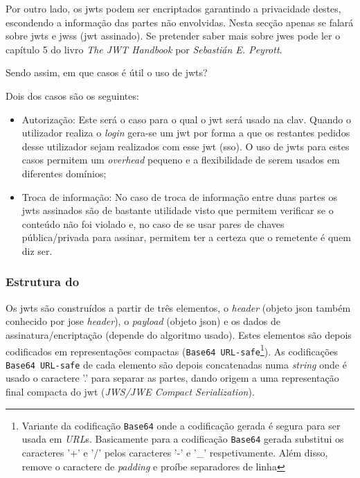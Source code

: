 Por outro lado, os \acrshort{jwt}s podem ser encriptados garantindo a privacidade destes, escondendo a informação 
das partes não envolvidas. Nesta secção apenas se falará sobre \acrshort{jwt}s e \acrshort{jws}s (\acrshort{jwt} 
assinado). Se pretender saber mais sobre \acrshort{jwe}s pode ler o capítulo 5 do livro \textit{The JWT Handbook} 
por \textit{Sebastián E. Peyrott}.

Sendo assim, em que casos é útil o uso de \acrshort{jwt}s? 

Dois dos casos são os seguintes:
\begin{itemize}
    \item Autorização: Este será o caso para o qual o \acrshort{jwt} será usado na \acrshort{clav}. 
    Quando o utilizador realiza o \textit{login} gera-se um \acrshort{jwt} por forma a que os restantes pedidos 
    desse utilizador sejam realizados com esse \acrshort{jwt} (\acrlong{sso}). 
    O uso de \acrshort{jwt}s para estes casos permitem um \textit{overhead} pequeno e a flexibilidade de serem 
    usados em diferentes domínios;
    \item Troca de informação: No caso de troca de informação entre duas partes os \acrshort{jwt}s assinados são 
    de bastante utilidade visto que permitem verificar se o conteúdo não foi violado e, no caso de se usar pares 
    de chaves pública/privada para assinar, permitem ter a certeza que o remetente é quem diz ser.
\end{itemize}

\subsubsection{Estrutura do }

Os \acrshort{jwt}s são construídos a partir de três elementos, o \textit{header} (objeto \acrshort{json} também 
conhecido por \acrshort{jose} \textit{header}), o \textit{payload} (objeto \acrshort{json}) e os dados de 
assinatura/encriptação (depende do algoritmo usado). Estes elementos são depois codificados em representações 
compactas (\texttt{Base64 URL-safe}\footnote{Variante da codificação \texttt{Base64} onde a codificação gerada 
é segura para ser usada em \textit{URL}s. Basicamente para a codificação \texttt{Base64} gerada substitui os 
caracteres '+' e '/' pelos caracteres '-' e '\_' respetivamente. Além disso, remove o caractere de 
\textit{padding} e proíbe separadores de linha}). As codificações \texttt{Base64 URL-safe} de cada elemento 
são depois concatenadas numa \textit{string} onde é usado o caractere '.' para separar as partes, dando origem 
a uma representação final compacta do \acrshort{jwt} (\textit{JWS/JWE Compact Serialization}). 

